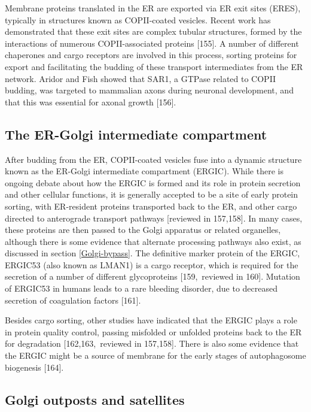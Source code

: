 \documentclass[
  12pt,
  a4paper,
]{book}
\begin{document}
Membrane proteins translated in the ER are exported via ER exit sites (ERES), typically in structures known as COPII-coated vesicles. Recent work has demonstrated that these exit sites are complex tubular structures, formed by the interactions of numerous COPII-associated proteins {[}155{]}. A number of different chaperones and cargo receptors are involved in this process, sorting proteins for export and facilitating the budding of these transport intermediates from the ER network. Aridor and Fish showed that SAR1, a GTPase related to COPII budding, was targeted to mammalian axons during neuronal development, and that this was essential for axonal growth {[}156{]}.

\hypertarget{the-er-golgi-intermediate-compartment}{%
\subsection{The ER-Golgi intermediate compartment}\label{the-er-golgi-intermediate-compartment}}

After budding from the ER, COPII-coated vesicles fuse into a dynamic structure known as the ER-Golgi intermediate compartment (ERGIC). While there is ongoing debate about how the ERGIC is formed and its role in protein secretion and other cellular functions, it is generally accepted to be a site of early protein sorting, with ER-resident proteins transported back to the ER, and other cargo directed to anterograde transport pathways {[}reviewed in 157,158{]}. In many cases, these proteins are then passed to the Golgi apparatus or related organelles, although there is some evidence that alternate processing pathways also exist, as discussed in section \ref{Golgi-bypass}. The definitive marker protein of the ERGIC, ERGIC53 (also known as LMAN1) is a cargo receptor, which is required for the secretion of a number of different glycoproteins {[}159,~reviewed in 160{]}. Mutation of ERGIC53 in humans leads to a rare bleeding disorder, due to decreased secretion of coagulation factors {[}161{]}.

Besides cargo sorting, other studies have indicated that the ERGIC plays a role in protein quality control, passing misfolded or unfolded proteins back to the ER for degradation {[}162,163,~reviewed in 157,158{]}. There is also some evidence that the ERGIC might be a source of membrane for the early stages of autophagosome biogenesis {[}164{]}.

\hypertarget{golgi-outposts-and-satellites}{%
\subsection{Golgi outposts and satellites}\label{golgi-outposts-and-satellites}}
\end{document}
